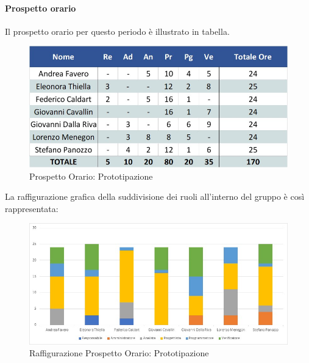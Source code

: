 \paragraph{Prospetto orario}
Il prospetto orario per questo periodo è illustrato in tabella.
\begin{figure}[H]
	\centerline{\includegraphics[scale=0.7]{img/Preventivo/PrototipazioneOrario.jpg}}
	\caption{Prospetto Orario: Prototipazione}
	\clearpage
\end{figure}
La raffigurazione grafica della suddivisione dei ruoli all'interno del gruppo è così rappresentata: 
\begin{figure}[H]
	\centerline{\includegraphics[scale=0.85]{img/Preventivo/Istogrammi/Prototipazione.jpg}}
	\caption{Raffigurazione Prospetto Orario: Prototipazione}
	\clearpage
\end{figure}
\newpage
